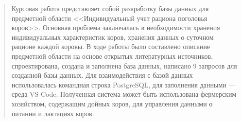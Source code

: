 


\begin{abstract}
    Курсовая работа представляет собой разаработку базы данных для предметной области <<Индивидуальный учет рациона поголовья коров>>. Основная проблема заключалась в необходимости хранения индивидуальных характеристик коров, хранения данных о суточном рационе каждой коровы. В ходе работы было составлено описание предметной области на основе открытых литературных источников, спроектирована, создана и заполнена база данных, написано 9 запросов для созданной базы данных. Для взаимодействия с базой данных использовалась командная строка PostgreSQL, для заполнения данными --- среда VS Code. Полученная система может быть использована фермерским хозяйством, содержащим дойных коров, для управления данными о питании и лактациях коров.
\end{abstract}

